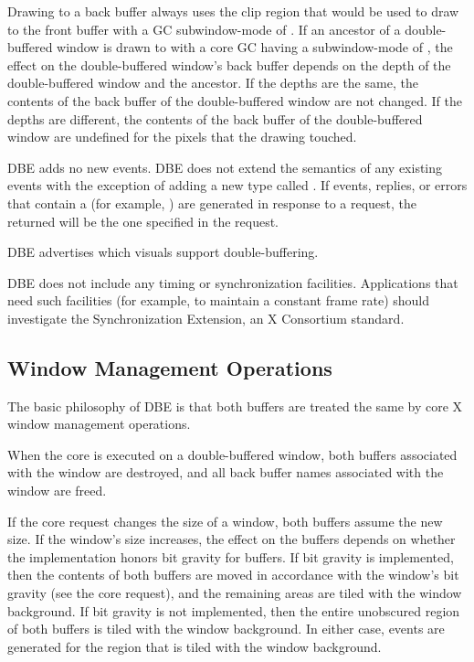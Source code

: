 Drawing to a back buffer always uses the clip region that would be
used to draw to the front buffer with a GC subwindow-mode of
.  If an ancestor of a double-buffered window is drawn
to with a core GC having a subwindow-mode of , the
effect on the double-buffered window's back buffer depends on the
depth of the double-buffered window and the ancestor.  If the depths
are the same, the contents of the back buffer of the double-buffered
window are not changed.  If the depths are different, the contents of
the back buffer of the double-buffered window are undefined for the
pixels that the  drawing touched.

DBE adds no new events.  DBE does not extend the semantics of any
existing events with the exception of adding a new 
type called .  If events, replies, or errors that
contain a  (for example, ) are
generated in
response to a request, the  returned will be the
one specified in the request.

DBE advertises which visuals support double-buffering.

DBE does not include any timing or synchronization facilities.
Applications that need such facilities (for example, to maintain a constant
frame rate) should investigate the Synchronization Extension, an X
Consortium standard.

\subsection{Window Management Operations}

The basic philosophy of DBE is that both buffers are treated the same by
core X window management operations.

When the core  is executed on a
double-buffered window, both buffers associated with the window are
destroyed, and all back buffer names associated with the window are
freed.

If the core  request changes the size of
a window, both buffers assume the new size.  If the window's size
increases, the effect on the buffers depends on whether the
implementation honors bit gravity for buffers.  If bit gravity is
implemented, then the contents of both buffers are moved in accordance
with the window's bit gravity (see the core
 request), and the remaining areas are
tiled with the window background.  If bit gravity is not implemented,
then the entire unobscured region of both buffers is tiled with the
window background.  In either case,  events are generated for
the region that is tiled with the window background.

